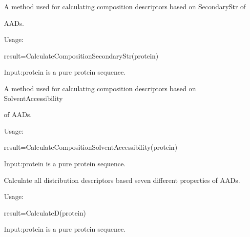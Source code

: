 \documentclass[letterpaper,10pt,english]{sphinxmanual}
\begin{document}

\begin{fulllineitems}
\label{reference/CTD:CTD.CalculateCompositionSecondaryStr}
A method used for calculating composition descriptors based on SecondaryStr of

AADs.

Usage:

result=CalculateCompositionSecondaryStr(protein)

Input:protein is a pure protein sequence.

\end{fulllineitems}


\begin{fulllineitems}
\label{reference/CTD:CTD.CalculateCompositionSolventAccessibility}
A method used for calculating composition descriptors based on SolventAccessibility

of  AADs.

Usage:

result=CalculateCompositionSolventAccessibility(protein)

Input:protein is a pure protein sequence.

\end{fulllineitems}


\begin{fulllineitems}
\label{reference/CTD:CTD.CalculateD}
Calculate all distribution descriptors based seven different properties of AADs.

Usage:

result=CalculateD(protein)

Input:protein is a pure protein sequence.

\end{fulllineitems}

\end{document}
